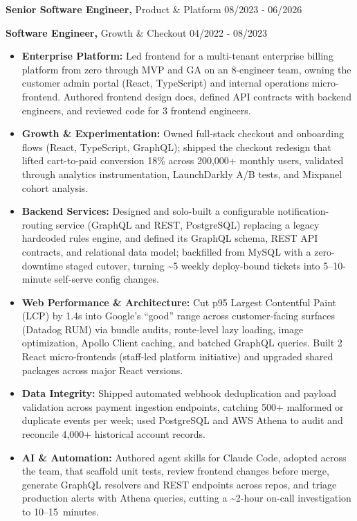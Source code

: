 \documentclass[11pt,letterpaper]{article}
\newcommand{\company}[2]{\par\needspace{6\baselineskip}\vspace{8pt}{\MakeUppercase{#1} \,$\vert$\, #2}\par\vspace{2pt}}
\newcommand{\roleline}[3]{{\textbf{#1}#2 \hfill #3}\par\vspace{2pt}}
\newcommand{\til}{\textasciitilde}
\begin{document}
	\company{Acme Cloud Systems}{Seattle, WA (remote)}
	\roleline{Senior Software Engineer,}{ Product \& Platform}{08/2023 - 06/2026}
	\roleline{Software Engineer,}{ Growth \& Checkout}{04/2022 - 08/2023}
	\begin{itemize}
		\item {\bfseries Enterprise Platform:} Led frontend for a multi-tenant enterprise billing platform from zero through MVP and GA on an 8-engineer team, owning the customer admin portal (React, TypeScript) and internal operations micro-frontend. Authored frontend design docs, defined API contracts with backend engineers, and reviewed code for 3 frontend engineers.
		\item {\bfseries Growth \& Experimentation:} Owned full-stack checkout and onboarding flows (React, TypeScript, GraphQL); shipped the checkout redesign that lifted cart-to-paid conversion 18\% across 200,000+ monthly users, validated through analytics instrumentation, LaunchDarkly A/B tests, and Mixpanel cohort analysis.
		\item {\bfseries Backend Services:} Designed and solo-built a configurable notification-routing service (GraphQL and REST, PostgreSQL) replacing a legacy hardcoded rules engine, and defined its GraphQL schema, REST API contracts, and relational data model; backfilled from MySQL with a zero-downtime staged cutover, turning \til 5 weekly deploy-bound tickets into \mbox{5--10-minute} self-serve config changes.
		\item {\bfseries Web Performance \& Architecture:} Cut p95 Largest Contentful Paint (LCP) by 1.4s into Google's ``good'' range across customer-facing surfaces (Datadog RUM) via bundle audits, route-level lazy loading, image optimization, Apollo Client caching, and batched GraphQL queries. Built 2 React micro-frontends (staff-led platform initiative) and upgraded shared packages across major React versions.
		\item {\bfseries Data Integrity:} Shipped automated webhook deduplication and payload validation across payment ingestion endpoints, catching 500+ malformed or duplicate events per week; used PostgreSQL and AWS Athena to audit and reconcile 4,000+ historical account records.
		\item {\bfseries AI \& Automation:} Authored agent skills for Claude Code, adopted across the team, that scaffold unit tests, review frontend changes before merge, generate GraphQL resolvers and REST endpoints across repos, and triage production alerts with Athena queries, cutting a \til 2-hour on-call investigation to \mbox{10--15 minutes}.

\end{itemize}
\end{document}
